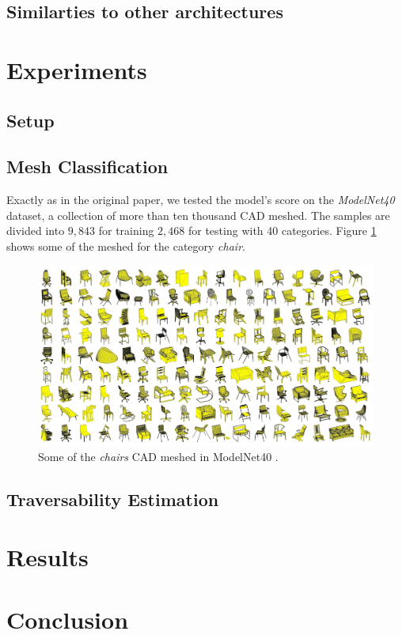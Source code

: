 \documentclass[twocolumn,showpacs,%
  nofootinbib,aps,superscriptaddress,%
  eqsecnum,prd,notitlepage,showkeys,10pt]{revtex4-1}
\begin{document}
\subsection{Similarties to other architectures}

\section{Experiments}
\subsection{Setup}
\subsection{Mesh Classification}
Exactly as in the original paper, we tested the model's score on the \emph{ModelNet40} dataset, a collection of more than ten thousand CAD meshed. The samples are divided into $9,843$ for training $2,468$ for testing with 40 categories. Figure \ref{fig : modelnet} shows some of the meshed for the category \emph{chair}.

\begin{figure}[H]
  \centering
  \includegraphics[width=\linewidth]{images/ModelNet.jpg}
\caption{Some of the \emph{chairs} CAD meshed in ModelNet40 \cite{shapenet}.}
\label{fig : modelnet}
\end{figure}
\subsection{Traversability Estimation}
\section{Results}

\section{Conclusion}
\newpage

\end{document}

